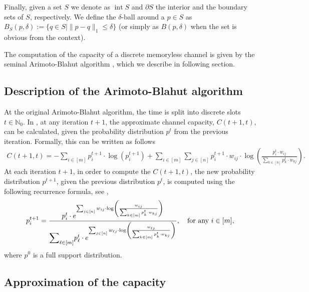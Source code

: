\documentclass[11pt, letterpaper]{article}
\DeclareMathOperator{\interior}{int}
\begin{document}
Finally, given a set $S$ we denote as $\interior S$ and $\partial S$ the interior and the boundary sets of $S$, respectively. We define the $\delta$-ball around a $p \in S$ as $B_S(p, \delta) := \{q \in S \mid \|p - q\|_1 \leq \delta\}$ (or simply as $B(p, \delta)$ when the set is obvious from the context). 

The computation of the capacity of a discrete memoryless channel is given by the seminal Arimoto-Blahut algorithm \cite{Arimoto1972AnAF,Blahut1972ComputationOC}, which we describe in following section.

\subsection{Description of the Arimoto-Blahut algorithm}

At the original Arimoto-Blahut algorithm, the time is split into discrete slots $t \in \mathbb{N}_0$. In \cite{Arimoto1972AnAF}, at any iteration $t+1$, the approximate channel capacity, $C(t+1, t)$, can be calculated, given the probability distribution $p^{t}$ from the previous iteration. Formally, this can be written as follows
\begin{equation}\label{eq: capacity at t and t - 1}
\begin{split}
    C(t+1,t) = - \sum_{i \in [m]} p^{t+1}_i \cdot \log(p^{t+1}_i) + \sum_{i \in [m]} \sum_{j \in [n]}  p^{t+1}_i \cdot w_{ij} \cdot \log \left( \frac{p^{t}_i \cdot w_{ij}}{\sum_{k \in [n]} p^{t}_k \cdot w_{kj} }\right).
\end{split}
\end{equation}
At each iteration $t+1$, in order to compute the $C(t+1,t)$, the new probability distribution $p^{t+1}$, given the previous distribution $p^{t}$, is computed using the following recurrence formula, see \cite{Arimoto1972AnAF,Nakagawa2020AnalysisOT},
\begin{equation}\label{eq:Arimoto-Blahut}
\begin{split}
    p^{t+1}_i = \frac{p^{t}_i \cdot e^{\sum_{j \in [n]} w_{ij} \cdot  \log\left(\frac{w_{ij}}{\sum_{k \in [m]} p^{t}_k \cdot w_{kj}}\right)}}{\mathlarger{\sum}\nolimits_{\ell \in [m]} p^{t}_{\ell} \cdot e^{\sum_{j \in [n]} w_{\ell j} \cdot  \log\left(\frac{w_{\ell j} }{\sum_{k \in [m]} p^{t}_k \cdot w_{kj}}\right)}}, \quad \text{for any } i \in [m],
\end{split}
\end{equation}
where $p^0$ is a full support distribution.

\subsection{Approximation of the capacity}\label{sec:approximate Arimoto Blahut}
\end{document}
